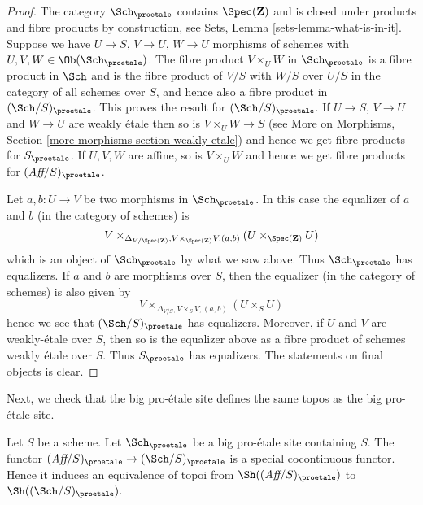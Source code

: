\begin{proof}
The category $\Sch_\proetale$ contains $\Spec(\mathbf{Z})$ and
is closed under products and fibre products by construction, see
Sets, Lemma \ref{sets-lemma-what-is-in-it}.
Suppose we have $U \to S$, $V \to U$, $W \to U$ morphisms
of schemes with $U, V, W \in \Ob(\Sch_\proetale)$.
The fibre product $V \times_U W$ in $\Sch_\proetale$
is a fibre product in $\Sch$ and
is the fibre product of $V/S$ with $W/S$ over $U/S$ in
the category of all schemes over $S$, and hence also a
fibre product in $(\Sch/S)_\proetale$.
This proves the result for $(\Sch/S)_\proetale$.
If $U \to S$, $V \to U$ and $W \to U$ are weakly \'etale then so is
$V \times_U W \to S$ (see
More on Morphisms, Section \ref{more-morphisms-section-weakly-etale})
and hence we get fibre products for $S_\proetale$.
If $U, V, W$ are affine, so is $V \times_U W$ and hence we
get fibre products for $(\textit{Aff}/S)_\proetale$.

\medskip\noindent
Let $a, b : U \to V$ be two morphisms in $\Sch_\proetale$.
In this case the equalizer of $a$ and $b$ (in the category of schemes) is
$$
V
\times_{\Delta_{V/\Spec(\mathbf{Z})}, V \times_{\Spec(\mathbf{Z})} V, (a, b)}
(U \times_{\Spec(\mathbf{Z})} U)
$$
which is an object of $\Sch_\proetale$ by what we saw above.
Thus $\Sch_\proetale$ has equalizers. If $a$ and $b$ are morphisms over $S$,
then the equalizer (in the category of schemes) is also given by
$$
V \times_{\Delta_{V/S}, V \times_S V, (a, b)} (U \times_S U)
$$
hence we see that $(\Sch/S)_\proetale$ has equalizers. Moreover, if
$U$ and $V$ are weakly-\'etale over $S$, then so is the equalizer
above as a fibre product of schemes weakly \'etale over $S$.
Thus $S_\proetale$ has equalizers. The statements on final objects
is clear.
\end{proof}

\noindent
Next, we check that the big pro-\'etale site defines the same
topos as the big pro-\'etale site.

\begin{lemma}
\label{lemma-affine-big-site-proetale}
Let $S$ be a scheme. Let $\Sch_\proetale$ be a big pro-\'etale
site containing $S$.
The functor $(\textit{Aff}/S)_\proetale \to (\Sch/S)_\proetale$
is a special cocontinuous functor. Hence it induces an equivalence
of topoi from $\Sh((\textit{Aff}/S)_\proetale)$ to
$\Sh((\Sch/S)_\proetale)$.
\end{lemma}

